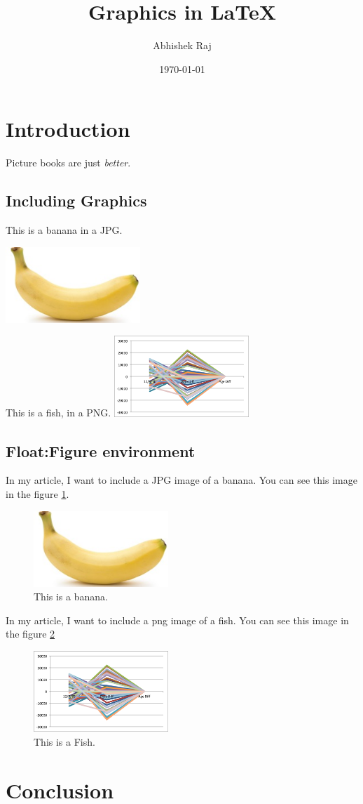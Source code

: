 \documentclass{proc} %
\title{Graphics in \LaTeX}
\author{Abhishek Raj}
\date{\today}
\begin{document}
	\maketitle
	
	\section{Introduction}
	Picture books are just \emph{better}.
	
	\subsection{Including Graphics}
	This is a banana in a JPG.
	
	\includegraphics[width=2in]{Banana.jpg}
	
	This is a fish, in a PNG.
	\includegraphics[width=2in]{Fish.png}
	
	\subsection{Float:Figure environment}
	In my article, I want to include a JPG image of a banana. You can see this image in the figure \ref{fig:banana}.
	
	\begin{figure}[htbp]
		\begin{center}
			\includegraphics[width=2in]{Banana.jpg}
		\end{center}
		\caption{This is a banana.}
		\label{fig:banana}
	\end{figure}
	
	In my article, I want to include a png image of a fish. You can see this image in the figure \ref{fig:Fish}
	
	\begin{figure}[htbp]
		\begin{center}
			\includegraphics[width=2in]{Fish.png}
		\end{center}
		\caption{This is a Fish.}
		\label{fig:Fish}
	\end{figure}
	
	\section{Conclusion}
\end{document}
